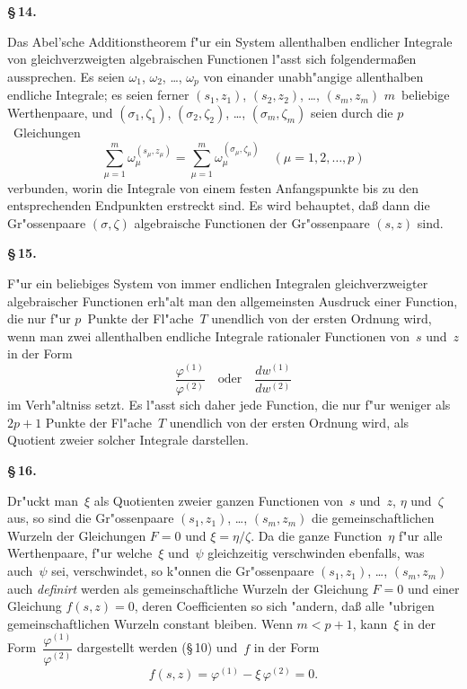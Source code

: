 \documentclass[12pt,a4paper]{book}
\theoremstyle{definition}
\theoremstyle{remark}
\begin{document}
\medskip
\textbf{\S\,14.}

Das Abel'sche Additionstheorem f"ur ein System allenthalben endlicher
Integrale von gleichverzweigten algebraischen Functionen l"asst sich
folgenderma\ss{}en aussprechen. Es seien $\omega_1$, $\omega_2$, \ldots, $\omega_p$ von
einander unabh"angige allenthalben endliche Integrale; es seien ferner
$(s_1,z_1)$, $(s_2,z_2)$, \ldots, $(s_m,z_m)$ $m$~beliebige Werthenpaare, und
$(\sigma_1,\zeta_1)$, $(\sigma_2,\zeta_2)$, \ldots, $(\sigma_m,\zeta_m)$ seien durch die
$p$~Gleichungen
\begin{equation}
\label{eq:abel}
\sum_{\mu=1}^{m} \omega_\mu^{(s_\mu,z_\mu)} =
\sum_{\mu=1}^{m} \omega_\mu^{(\sigma_\mu,\zeta_\mu)}
\quad (\mu = 1, 2, \ldots, p)
\end{equation}
verbunden, worin die Integrale von einem festen Anfangspunkte bis zu den
entsprechenden Endpunkten erstreckt sind. Es wird behauptet, da\ss{} dann
die Gr"ossenpaare $(\sigma,\zeta)$ algebraische Functionen der Gr"ossenpaare
$(s,z)$ sind.

\medskip
\textbf{\S\,15.}

F"ur ein beliebiges System von immer endlichen Integralen
 gleichverzweigter algebraischer Functionen erh"alt man den allgemeinsten
Ausdruck einer Function, die nur f"ur $p$~Punkte der Fl"ache~$T$ unendlich
von der ersten Ordnung wird, wenn man zwei allenthalben endliche
Integrale rationaler Functionen von~$s$ und~$z$ in der Form
\[
\frac{\varphi^{(1)}}{\varphi^{(2)}} \quad \text{oder} \quad \frac{dw^{(1)}}{dw^{(2)}}
\]
im Verh"altniss setzt. Es l"asst sich daher jede Function, die nur f"ur
weniger als $2p + 1$ Punkte der Fl"ache~$T$ unendlich von der ersten
Ordnung wird, als Quotient zweier solcher Integrale darstellen.

\medskip
\textbf{\S\,16.}

Dr"uckt man~$\xi$ als Quotienten zweier ganzen Functionen von~$s$
und~$z$, $\eta$ und~$\zeta$ aus, so sind die Gr"ossenpaare $(s_1,z_1)$, \ldots,
$(s_m,z_m)$ die gemeinschaftlichen Wurzeln der Gleichungen $F = 0$ und
$\xi = \eta/\zeta$. Da die ganze Function~$\eta$ f"ur alle Werthenpaare, f"ur
welche~$\xi$ und~$\psi$ gleichzeitig verschwinden ebenfalls, was auch~$\psi$ sei,
verschwindet, so k"onnen die Gr"ossenpaare $(s_1,z_1)$, \ldots, $(s_m,z_m)$
auch \emph{definirt} werden als gemeinschaftliche Wurzeln der Gleichung $F = 0$
und einer Gleichung $f(s,z) = 0$, deren Coefficienten so sich "andern,
da\ss{} alle "ubrigen gemeinschaftlichen Wurzeln constant bleiben. Wenn
$m < p + 1$, kann~$\xi$ in der Form~$\dfrac{\varphi^{(1)}}{\varphi^{(2)}}$ dargestellt werden
(\S\,10) und~$f$ in der Form
\[
f(s,z) = \varphi^{(1)} - \xi\, \varphi^{(2)} = 0.
\]
\end{document}
